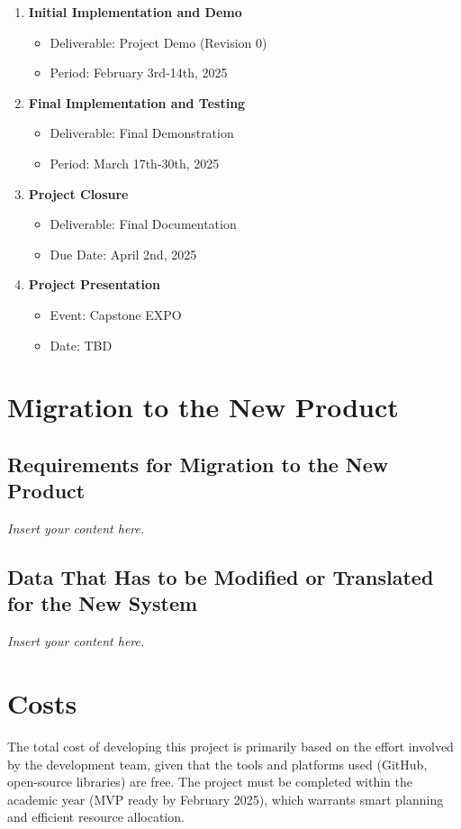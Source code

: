 \documentclass[12pt]{article}
\newcommand{\lips}{\textit{Insert your content here.}}
\begin{document}
\begin{enumerate}
    \item \textbf{Initial Implementation and Demo}
    \begin{itemize}
        \item Deliverable: Project Demo (Revision 0)
        \item Period: February 3rd-14th, 2025
    \end{itemize}
    
    \item \textbf{Final Implementation and Testing}
    \begin{itemize}
        \item Deliverable: Final Demonstration
        \item Period: March 17th-30th, 2025
    \end{itemize}
    
    \item \textbf{Project Closure}
    \begin{itemize}
        \item Deliverable: Final Documentation
        \item Due Date: April 2nd, 2025
    \end{itemize}
    
    \item \textbf{Project Presentation}
    \begin{itemize}
        \item Event: Capstone EXPO
        \item Date: TBD
    \end{itemize}
\end{enumerate}


\section{Migration to the New Product}
\subsection{Requirements for Migration to the New Product}
\lips
\subsection{Data That Has to be Modified or Translated for the New System}
\lips

\section{Costs}
The total cost of developing this project is primarily based on the effort involved by the development team, given that the tools and platforms used (GitHub, open-source libraries) are free. The project must be completed within the academic year (MVP ready by February 2025), which warrants smart planning and efficient resource allocation.
\end{document}
